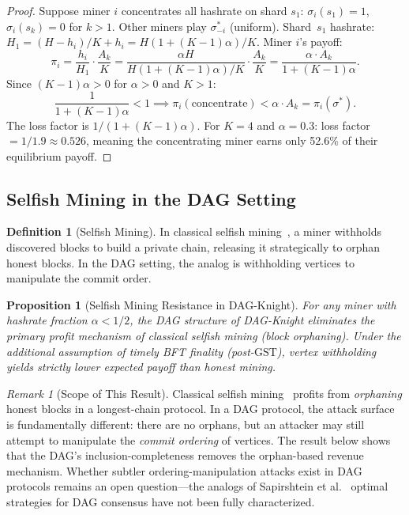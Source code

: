 \documentclass[11pt,a4paper]{article}
\newtheorem{proposition}[theorem]{Proposition}
\theoremstyle{definition}
\newtheorem{definition}[theorem]{Definition}
\theoremstyle{remark}
\newtheorem{remark}[theorem]{Remark}
\newcommand{\DK}{\textsf{DAG-Knight}}
\newcommand{\GST}{\mathrm{GST}}
\newcommand{\payoff}{\pi}
\newcommand{\strategy}{\sigma}
\newcommand{\hashrate}{h}
\newcommand{\Hashrate}{H}
\begin{document}
\begin{proof}
Suppose miner $i$ concentrates all hashrate on shard $s_1$:
$\strategy_i(s_1) = 1$, $\strategy_i(s_k) = 0$ for $k > 1$.
Other miners play $\strategy^*_{-i}$ (uniform).
Shard~$s_1$ hashrate: $\Hashrate_1 = (\Hashrate - \hashrate_i)/K + \hashrate_i
= \Hashrate(1 + (K-1)\alpha) / K$.
Miner $i$'s payoff:
\[
  \payoff_i = \frac{\hashrate_i}{\Hashrate_1} \cdot \frac{A_k}{K}
  = \frac{\alpha \Hashrate}{\Hashrate(1+(K-1)\alpha)/K} \cdot \frac{A_k}{K}
  = \frac{\alpha \cdot A_k}{1 + (K-1)\alpha}.
\]
Since $(K-1)\alpha > 0$ for $\alpha > 0$ and $K > 1$:
\[
  \frac{1}{1+(K-1)\alpha} < 1 \implies
  \payoff_i(\text{concentrate}) < \alpha \cdot A_k = \payoff_i(\strategy^*).
\]
The loss factor is $1/(1+(K-1)\alpha)$.
For $K = 4$ and $\alpha = 0.3$: loss factor $= 1/1.9 \approx 0.526$,
meaning the concentrating miner earns only 52.6\% of their equilibrium payoff.
\end{proof}

\subsection{Selfish Mining in the DAG Setting}

\begin{definition}[Selfish Mining]\label{def:selfish}
In classical selfish mining~\cite{eyal2014selfish}, a miner withholds
discovered blocks to build a private chain, releasing it strategically
to orphan honest blocks.
In the DAG setting, the analog is withholding vertices to manipulate
the commit order.
\end{definition}

\begin{proposition}[Selfish Mining Resistance in DAG-Knight]\label{thm:selfish}
For any miner with hashrate fraction $\alpha < 1/2$, the DAG structure
of \DK{} eliminates the primary profit mechanism of classical selfish
mining (block orphaning).
Under the additional assumption of timely BFT finality (post-$\GST$),
vertex withholding yields strictly lower expected payoff than honest mining.
\end{proposition}

\begin{remark}[Scope of This Result]\label{rem:selfish-scope}
Classical selfish mining~\cite{eyal2014selfish} profits from
\emph{orphaning} honest blocks in a longest-chain protocol.
In a DAG protocol, the attack surface is fundamentally different:
there are no orphans, but an attacker may still attempt to manipulate
the \emph{commit ordering} of vertices.
The result below shows that the DAG's inclusion-completeness removes the
orphan-based revenue mechanism.
Whether subtler ordering-manipulation attacks exist in DAG protocols
remains an open question---the analogs of Sapirshtein et
al.~\cite{sapirshtein2016optimal} optimal strategies for DAG consensus
have not been fully characterized.
\end{remark}
\end{document}
